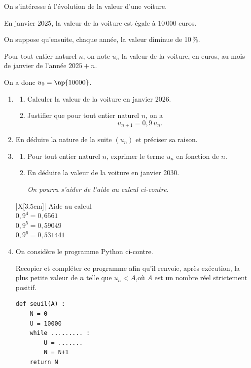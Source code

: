 On s'intéresse à l'évolution de la valeur d'une voiture.

En janvier 2025, la valeur de la voiture est égale à 10\,000 euros.

On suppose qu'ensuite, chaque année, la valeur diminue de 10\,\%.

Pour tout entier naturel $n$, on note $u_n$ la valeur de la voiture, en euros, au mois de janvier de l'année $2025 + n$.

On a donc $u_0 = \np{10000}$.

\begin{enumerate}
	\item \begin{enumerate}
		\item Calculer la valeur de la voiture en janvier 2026.
		\item Justifier que pour tout entier naturel $n$, on a
		\[u_{n+1} = 0,9\, u_n.\]
	\end{enumerate}

	\item En déduire la nature de la suite $(u_n)$ et préciser sa raison.

	\item \begin{minipage}[t]{0.75\linewidth}
		\begin{enumerate}
			\item Pour tout entier naturel $n$, exprimer le terme $u_n$ en fonction de $n$.

			\item En déduire la valeur de la voiture en janvier 2030.

			\emph{On pourra s'aider de l'aide au calcul ci-contre.}
		\end{enumerate}
	\end{minipage}
	\hfill
	\begin{tblr}[t]{|X[3.5cm]|}\hline
		Aide au calcul\\
		$0,9^4 = 0,6561$\\
		$0,9^5 = 0,59049$\\
		$0,9^6 = 0,531441$\\ \hline
	\end{tblr}

	\item \begin{minipage}[t]{0.62\linewidth}
		On considère le programme Python ci-contre.

		Recopier et compléter ce programme afin qu'il renvoie, après exécution, la plus petite valeur de $n$ telle que \quad$u_n < A$,\quad où $A$ est un nombre réel strictement positif.
	\end{minipage}\hfill
	\begin{minipage}[t]{5.5cm}
		\begin{lstlisting}[style=python,numbers=none,xleftmargin=0mm,xrightmargin=0mm]
def seuil(A) :
	N = 0
	U = 10000
	while ......... :
		U = .......
		N = N+1
	return N
\end{lstlisting}
	\end{minipage}


\end{enumerate}
